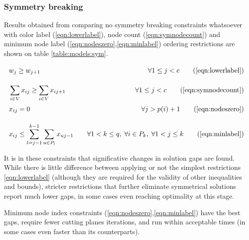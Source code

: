 \subsubsection*{Symmetry breaking}

Results obtained from comparing no symmetry breaking constraints whatsoever with color label (\ref{eqn:lowerlabel}), node count (\ref{eqn:symnodecount}) and minimum node label (\ref{eqn:nodeszero},\ref{eqn:minlabel}) ordering restrictions are shown on table \ref{table:models:sym}.

\begin{align*}
& w_j \geq w_{j+1} \sumheight \quad &\forall 1 \leq j < c \tag{\ref{eqn:lowerlabel}} \\
& \sum_{i \in V} x_{ij} \geq \sum_{i \in V} x_{ij+1} \quad &\forall 1 \leq j < c \tag{\ref{eqn:symnodecount}} \\
& x_{ij} = 0 \sumheight \quad &\forall j > p(i) + 1 \tag{\ref{eqn:nodeszero}} \\
& x_{ij} \leq \sum_{l = j-1}^{k-1} \sum_{u \in P_l} x_{uj-1} \quad &\forall 1 < k \leq q, \; \forall i \in P_k, \; \forall 1 < j \leq k \tag{\ref{eqn:minlabel}}
\end{align*}

It is in these constraints that significative changes in solution gaps are found. While there is little difference between applying or not the simplest restrictions \ref{eqn:lowerlabel} (although they are required for the validity of other inequalities and bounds), stricter restrictions that further eliminate symmetrical solutions report much lower gaps, in some cases even reaching optimality at this stage. 

Minimum node index constraints (\ref{eqn:nodeszero},\ref{eqn:minlabel}) have the best gaps, require fewer cutting planes iterations, and run within acceptable times (in some cases even faster than its counterparts).

